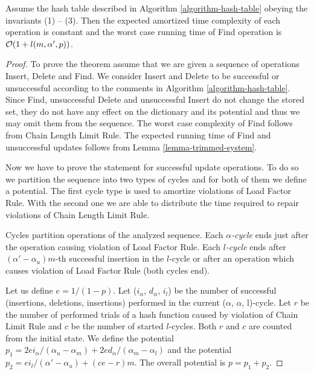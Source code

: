 \begin{theorem}
\label{theorem-amortised-expected-time}
Assume the hash table described in Algorithm \ref{algorithm-hash-table} obeying the invariants (1) -- (3). Then the expected amortized time complexity of each operation is constant and the worst case running time of Find operation is $\mathcal{O}(1 + l(m, \alpha', p))$.
\end{theorem}
\begin{proof}
To prove the theorem assume that we are given a sequence of operations Insert, Delete and Find. We consider Insert and Delete to be successful or unsuccessful according to the comments in Algorithm \ref{algorithm-hash-table}. Since Find, unsuccessful Delete and unsuccessful Insert do not change the stored set, they do not have any effect on the dictionary and its potential and thus we may omit them from the sequence. The worst case complexity of Find follows from Chain Length Limit Rule. The expected running time of Find and unsuccessful updates follows from Lemma \ref{lemma-trimmed-system}. 

Now we have to prove the statement for successful update operations. To do so we partition the sequence into two types of cycles and for both of them we define a potential. The first cycle type is used to amortize violations of Load Factor Rule. With the second one we are able to distribute the time required to repair violations of Chain Length Limit Rule.

\begin{definition}
Cycles partition operations of the analyzed sequence.
Each \emph{$\alpha$-cycle} ends just after the operation causing violation of Load Factor Rule.
Each \emph{$l$-cycle} ends after $(\alpha'-\alpha_u)m$-th successful insertion in the $l$-cycle or after an operation which causes violation of Load Factor Rule (both cycles end).
\end{definition}

Let us define $e = 1/(1-p)$. Let ($i_{\alpha}$, $d_\alpha$, $i_l$) be the number of successful (insertions, deletions, insertions) performed in the current ($\alpha$, $\alpha$, l)-cycle. Let $r$ be the number of performed trials of a hash function caused by violation of Chain Limit Rule and $c$ be the number of started $l$-cycles. Both $r$ and $c$ are counted from the initial state. We define the potential $p_1 = {2ei_{\alpha}}/{(\alpha_u - \alpha_m)} + {2ed_{\alpha}}/{(\alpha_m - \alpha_l)}$ and the potential $p_2 = {ei_{l}}/{(\alpha' - \alpha_u)} + (ce - r) m$.  The overall potential is $p = p_1 + p_2$.


\end{proof}
